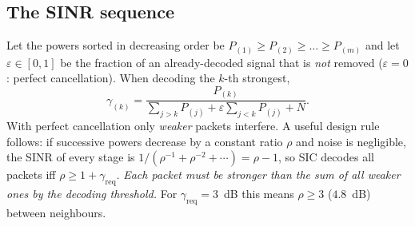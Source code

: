 \subsection{The SINR sequence}

Let the powers sorted in decreasing order be $P_{(1)}\ge P_{(2)}\ge\dots\ge P_{(m)}$ and let $\varepsilon\in[0,1]$ be the fraction of an
already-decoded signal that is \emph{not} removed ($\varepsilon=0$: perfect cancellation). When decoding the $k$-th strongest,
\begin{equation}
 \gamma_{(k)}=\frac{P_{(k)}}{\displaystyle\sum_{j>k}P_{(j)}+\varepsilon\sum_{j<k}P_{(j)}+N}.
\label{eq:sicsinr}
\end{equation}
With perfect cancellation only \emph{weaker} packets interfere. A useful design rule follows: if successive powers
decrease by a constant ratio $\rho$ and noise is negligible, the SINR of every stage is
$1/(\rho^{-1}+\rho^{-2}+\cdots)=\rho-1$, so SIC decodes all packets iff $\rho\ge1+\gamma_{\mathrm{req}}$.
\emph{Each packet must be stronger than the sum of all weaker ones by the decoding threshold.}
For $\gamma_{\mathrm{req}}=3$~dB this means $\rho\ge3$ ($4.8$~dB) between neighbours.

